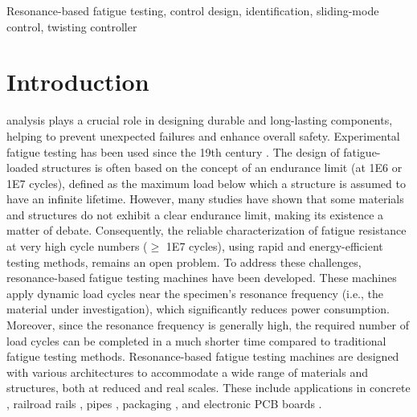 \documentclass[lettersize,journal]{IEEEtran}
\begin{document}
\begin{IEEEkeywords}
Resonance-based fatigue testing, control design, identification, sliding-mode control, twisting controller
\end{IEEEkeywords}

\section{Introduction} \label{S_introduction}
analysis plays a crucial role in designing durable and long-lasting components, helping to prevent unexpected failures and enhance overall safety. Experimental fatigue testing has been used since the 19th century \cite{radaj2007ermudungsfestigkeit}.
 The design of fatigue-loaded structures is often based on the concept of an endurance limit (at 1E6 or 1E7 cycles), defined as the maximum load below which a structure is assumed to have an infinite lifetime. However, many studies have shown that some materials and structures do not exhibit a clear endurance limit, making its existence a matter of debate. Consequently, the reliable characterization of fatigue resistance at very high cycle numbers ($\geq$ 1E7 cycles), using rapid and energy-efficient testing methods, remains an open problem. To address these challenges, resonance-based fatigue testing machines have been developed. These machines apply dynamic load cycles near the specimen’s resonance frequency (i.e., the material under investigation), which significantly reduces power consumption. Moreover, since the resonance frequency is generally high, the required number of load cycles can be completed in a much shorter time compared to traditional fatigue testing methods. Resonance-based fatigue testing machines are designed with various architectures to accommodate a wide range of materials and structures, both at reduced and real scales. These include applications in concrete \cite{SCHRAMM2024117045}, railroad rails \cite{SCHNEIDER2018171,herrmann2018simulation_Thesis}, pipes \cite{Santus_2024}, packaging \cite{Rouillard_2000}, and electronic PCB boards \cite{DORANGA2024115368,ikehara2010development}.
\end{document}
